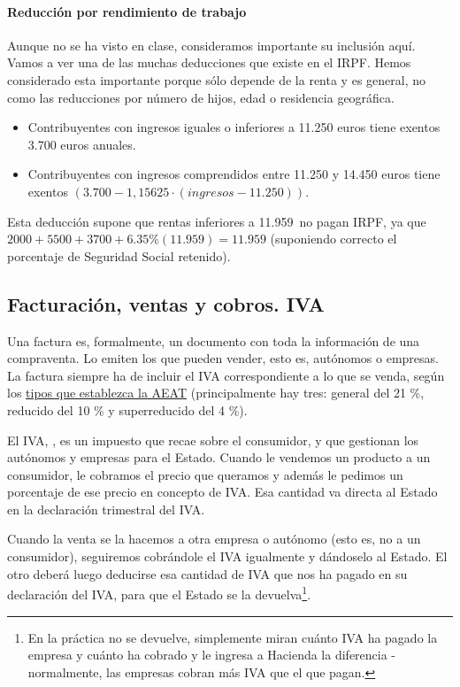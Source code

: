 \documentclass[nochap,palatino,shortheader]{apuntes}
\newcommand{\study}[1]{#1} \newcommand{\substudy}[1]{#1}
\begin{document}
\paragraph{Reducción por rendimiento de trabajo}

Aunque no se ha visto en clase, consideramos importante su inclusión aquí. Vamos a ver una de las muchas deducciones que existe en el IRPF. Hemos considerado esta importante porque sólo depende de la renta y es general, no como las reducciones por número de hijos, edad o residencia geográfica.

\begin{itemize}
\item Contribuyentes con ingresos iguales o inferiores a 11.250 euros tiene exentos 3.700 euros anuales.
\item Contribuyentes con ingresos comprendidos entre 11.250 y 14.450 euros tiene exentos $(3.700  - 1,15625 · (ingresos - 11.250))$.
\end{itemize}

Esta deducción supone que rentas inferiores a 11.959\texteuro\ no pagan IRPF, ya que $2000+5500+3700+6.35\% (11.959) = 11.959$ (suponiendo correcto el porcentaje de Seguridad Social retenido).

\subsection{Facturación, ventas y cobros. IVA}

Una factura es, formalmente, un documento con toda la información de una compraventa. Lo emiten los que pueden vender, esto es, autónomos o empresas. La factura siempre ha de incluir el IVA correspondiente a lo que se venda, según los \href{http://www.agenciatributaria.es/static_files/AEAT/Contenidos_Comunes/La_Agencia_Tributaria/Segmentos_Usuarios/Empresas_y_profesionales/Novedades_IVA_2014/Nuevos_tipos_IVA.pdf}{tipos que establezca la AEAT} 
(principalmente hay tres: \substudy{general del 21 \%, reducido del 10 \% y superreducido del 4 \%}).

El IVA, , es un impuesto que recae sobre el consumidor, y que gestionan los autónomos y empresas para el Estado. Cuando le vendemos un producto a un consumidor, le cobramos el precio que queramos y además le pedimos un porcentaje de ese precio en concepto de IVA.
Esa cantidad va directa al Estado en la \study{declaración trimestral del IVA}.

Cuando la venta se la hacemos a otra empresa o autónomo (esto es, no a un consumidor), seguiremos cobrándole el IVA igualmente y dándoselo al Estado. El otro deberá luego deducirse esa cantidad de IVA que nos ha pagado en su declaración del IVA, para que el Estado se la devuelva\footnote{En la práctica no se devuelve, simplemente miran cuánto IVA ha pagado la empresa y cuánto ha cobrado y le ingresa a Hacienda la diferencia - normalmente, las empresas cobran más IVA que el que pagan.}.
\end{document}
